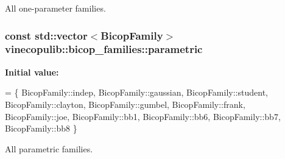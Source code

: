 All one-\/parameter families. 

\hypertarget{namespacevinecopulib_1_1bicop__families_a76d66bb6cb03ae4de1cef3d1ed70ac16}{
\subsubsection[{parametric}]{\setlength{\rightskip}{0pt plus 5cm}const std\+::vector$<${\bf Bicop\+Family}$>$ vinecopulib\+::bicop\+\_\+families\+::parametric}}\label{namespacevinecopulib_1_1bicop__families_a76d66bb6cb03ae4de1cef3d1ed70ac16}
{\bfseries Initial value\+:}
\begin{DoxyCode}
= \{
            BicopFamily::indep,
            BicopFamily::gaussian,
            BicopFamily::student,
            BicopFamily::clayton,
            BicopFamily::gumbel,
            BicopFamily::frank,
            BicopFamily::joe,
            BicopFamily::bb1, 
            BicopFamily::bb6, 
            BicopFamily::bb7, 
            BicopFamily::bb8
        \}
\end{DoxyCode}


All parametric families. 

